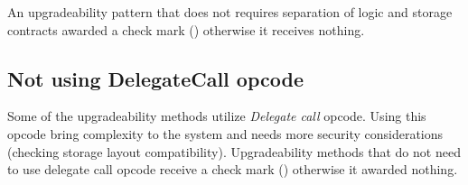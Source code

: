 An upgradeability pattern that does not requires separation of logic and storage contracts awarded a check mark (\checkmark) otherwise it receives nothing.

\subsection{Not using DelegateCall opcode}

Some of the upgradeability methods utilize \textit{Delegate call} opcode. Using  this opcode bring complexity to the system and needs more security considerations (\eg checking storage layout compatibility). Upgradeability methods that do not need to use delegate call opcode receive a check mark (\checkmark) otherwise it awarded nothing. 
 

 
 
 
